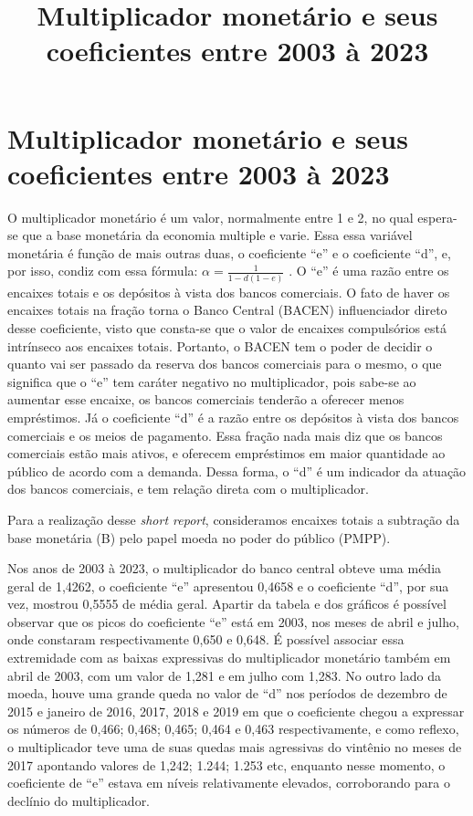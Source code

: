 \documentclass[12pt]{article}
\date{} %
\title{Multiplicador monetário e seus coeficientes entre 2003 à 2023}
\begin{document}
\section*{Multiplicador monetário e seus coeficientes entre 2003 à 2023}

O multiplicador monetário é um valor, normalmente entre 1 e 2, no qual
espera-se que a base monetária da economia multiple e varie. Essa essa
variável monetária é função de mais outras duas, o coeficiente ``e'' e o
coeficiente ``d'', e, por isso, condiz com essa fórmula:
\(\alpha = \frac{1}{1-d(1-e)}\) . O ``e'' é uma razão entre os encaixes
totais e os depósitos à vista dos bancos comerciais. O fato de haver os
encaixes totais na fração torna o Banco Central (BACEN) influenciador
direto desse coeficiente, visto que consta-se que o valor de encaixes
compulsórios está intrínseco aos encaixes totais. Portanto, o BACEN tem
o poder de decidir o quanto vai ser passado da reserva dos bancos
comerciais para o mesmo, o que significa que o ``e'' tem caráter
negativo no multiplicador, pois sabe-se ao aumentar esse encaixe, os
bancos comerciais tenderão a oferecer menos empréstimos. Já o
coeficiente ``d'' é a razão entre os depósitos à vista dos bancos
comerciais e os meios de pagamento. Essa fração nada mais diz que os
bancos comerciais estão mais ativos, e oferecem empréstimos em maior
quantidade ao público de acordo com a demanda. Dessa forma, o ``d'' é um
indicador da atuação dos bancos comerciais, e tem relação direta com o
multiplicador.

Para a realização desse \textit{short report}, consideramos encaixes
totais a subtração da base monetária (B) pelo papel moeda no poder do
público (PMPP).

Nos anos de 2003 à 2023, o multiplicador do banco central obteve uma
média geral de 1,4262, o coeficiente ``e'' apresentou 0,4658 e o
coeficiente ``d'', por sua vez, mostrou 0,5555 de média geral. Apartir
da tabela e dos gráficos é possível observar que os picos do coeficiente
``e'' está em 2003, nos meses de abril e julho, onde constaram
respectivamente 0,650 e 0,648. É possível associar essa extremidade com
as baixas expressivas do multiplicador monetário também em abril de
2003, com um valor de 1,281 e em julho com 1,283. No outro lado da
moeda, houve uma grande queda no valor de ``d'' nos períodos de dezembro
de 2015 e janeiro de 2016, 2017, 2018 e 2019 em que o coeficiente chegou
a expressar os números de 0,466; 0,468; 0,465; 0,464 e 0,463
respectivamente, e como reflexo, o multiplicador teve uma de suas quedas
mais agressivas do vintênio no meses de 2017 apontando valores de 1,242;
1.244; 1.253 etc, enquanto nesse momento, o coeficiente de ``e'' estava
em níveis relativamente elevados, corroborando para o declínio do
multiplicador.
\end{document}

